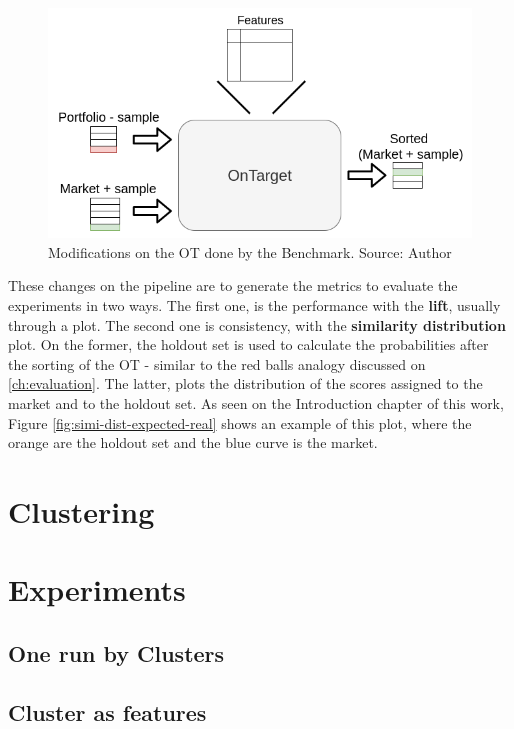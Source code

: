 \begin{figure}[h]
   \centering
   \includegraphics[width=\linewidth]{fig/ch3-ot-benchmark-blocks.png}
   \caption{Modifications on the OT done by the Benchmark. Source: Author}
   \label{fig:ot-benchmark-blocks}
\end{figure}

These changes on the pipeline are to generate the metrics to evaluate the experiments in two ways. The first one, is the performance with the \textbf{lift}, usually through a plot. The second one is consistency, with the \textbf{similarity distribution} plot. On the former, the holdout set is used to calculate the probabilities after the sorting of the OT - similar to the red balls analogy discussed on \ref{ch:evaluation}. The latter, plots the distribution of the scores assigned to the market and to the holdout set. As seen on the Introduction chapter of this work, Figure \ref{fig:simi-dist-expected-real} shows an example of this plot, where the orange are the holdout set and the blue curve is the market.


\section{Clustering}


\section{Experiments}

\subsection{One run by Clusters}

\subsection{Cluster as features}

